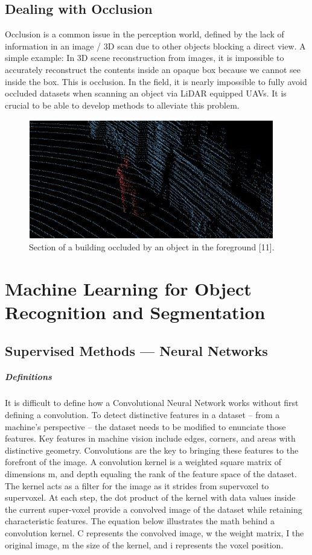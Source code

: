 \documentclass[12pt]{drexelthesis}
\begin{document}
\subsection{Dealing with Occlusion}
Occlusion is a common issue in the perception world, defined by the lack of information in an image / 3D scan due to other objects blocking a direct view. A simple example: In 3D scene reconstruction from images, it is impossible to accurately reconstruct the contents inside an opaque box because we cannot see inside the box. This is occlusion. In the field, it is nearly impossible to fully avoid occluded datasets when scanning an object via LiDAR equipped UAVs. It is crucial to be able to develop methods to alleviate this problem.

\begin{figure}
\centering
\includegraphics{occluded_man.jpg}
\caption[Demonstration of occlusion]{Section of a building occluded by an object in the foreground [11].}
\end{figure}


\section{Machine Learning for Object Recognition and Segmentation}
\label{sec:machinelearning}
\subsection{Supervised Methods --- Neural Networks}
\subparagraph{Definitions}
It is difficult to define how a Convolutional Neural Network works without first defining a convolution. To detect distinctive features in a dataset – from a machine’s perspective – the dataset needs to be modified to enunciate those features. Key features in machine vision include edges, corners, and areas with distinctive geometry. Convolutions are the key to bringing these features to the forefront of the image.
A convolution kernel is a weighted square matrix of dimensions m, and depth equaling the rank of the feature space of the dataset. The kernel acts as a filter for the image as it strides from supervoxel to supervoxel. At each step, the dot product of the kernel with data values inside the current super-voxel provide a convolved image of the dataset while retaining characteristic features. The equation below illustrates the math behind a convolution kernel. C represents the convolved image, w the weight matrix, I the original image, m the size of the kernel, and i represents the voxel position.
\end{document}
